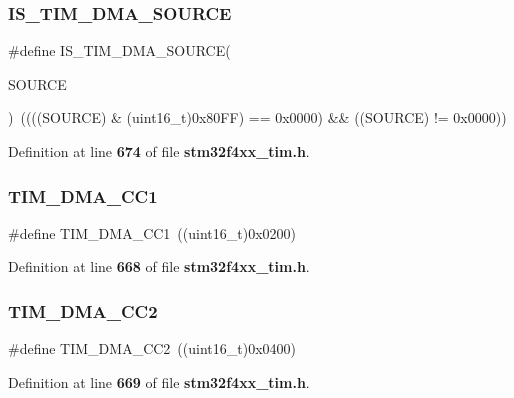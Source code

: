 \subsubsection{I\+S\+\_\+\+T\+I\+M\+\_\+\+D\+M\+A\+\_\+\+S\+O\+U\+R\+CE}
{\footnotesize\ttfamily \#define I\+S\+\_\+\+T\+I\+M\+\_\+\+D\+M\+A\+\_\+\+S\+O\+U\+R\+CE(\begin{DoxyParamCaption}\item[{}]{S\+O\+U\+R\+CE }\end{DoxyParamCaption})~((((S\+O\+U\+R\+CE) \& (uint16\+\_\+t)0x80\+F\+F) == 0x0000) \&\& ((\+S\+O\+U\+R\+C\+E) != 0x0000))}



Definition at line \textbf{ 674} of file \textbf{ stm32f4xx\+\_\+tim.\+h}.

\mbox{\label{group__TIM__DMA__sources_ga33b93e8bb82fe8e167b9e9c962c54f83}} 
\subsubsection{T\+I\+M\+\_\+\+D\+M\+A\+\_\+\+C\+C1}
{\footnotesize\ttfamily \#define T\+I\+M\+\_\+\+D\+M\+A\+\_\+\+C\+C1~((uint16\+\_\+t)0x0200)}



Definition at line \textbf{ 668} of file \textbf{ stm32f4xx\+\_\+tim.\+h}.

\mbox{\label{group__TIM__DMA__sources_ga792f73196a8e7424655592097d7a3fd5}} 
\subsubsection{T\+I\+M\+\_\+\+D\+M\+A\+\_\+\+C\+C2}
{\footnotesize\ttfamily \#define T\+I\+M\+\_\+\+D\+M\+A\+\_\+\+C\+C2~((uint16\+\_\+t)0x0400)}



Definition at line \textbf{ 669} of file \textbf{ stm32f4xx\+\_\+tim.\+h}.

